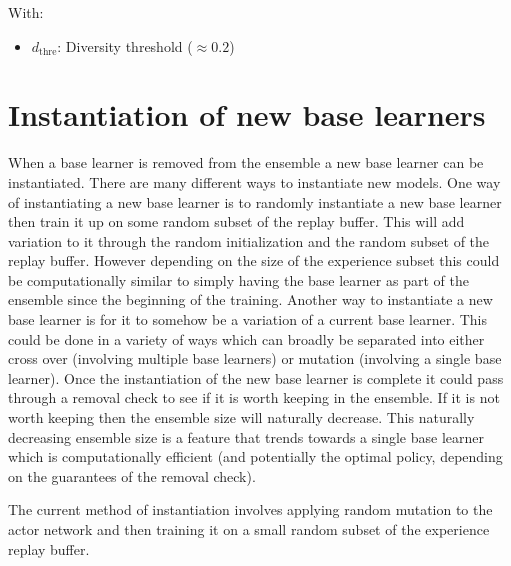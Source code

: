 With:
\begin{itemize}
    \item $d_{\text{thre}}$: Diversity threshold ($\approx 0.2$)
\end{itemize}



\section{Instantiation of new base learners}
\label{sec:instantiation}

When a base learner is removed from the ensemble a new base learner can be instantiated. There are many different ways to instantiate new models. One way of instantiating a new base learner is to randomly instantiate a new base learner then train it up on some random subset of the replay buffer. This will add variation to it through the random initialization and the random subset of the replay buffer. However depending on the size of the experience subset this could be computationally similar to simply having the base learner as part of the ensemble since the beginning of the training. Another way to instantiate a new base learner is for it to somehow be a variation of a current base learner. This could be done in a variety of ways which can broadly be separated into either cross over (involving multiple base learners) or mutation (involving a single base learner). Once the instantiation of the new base learner is complete it could pass through a removal check to see if it is worth keeping in the ensemble. If it is not worth keeping then the ensemble size will naturally decrease. This naturally decreasing ensemble size is a feature that trends towards a single base learner which is computationally efficient (and potentially the optimal policy, depending on the guarantees of the removal check).

The current method of instantiation involves applying random mutation to the actor network and then training it on a small random subset of the experience replay buffer.

